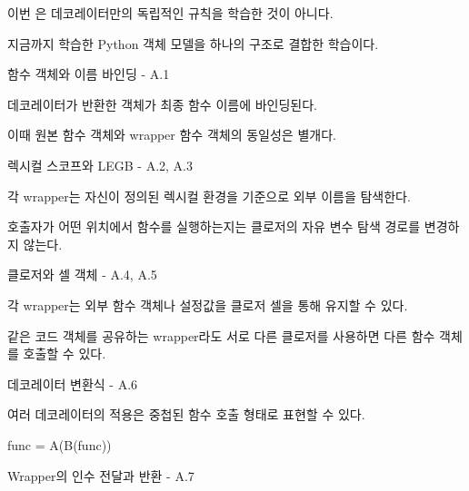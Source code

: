이번 은 데코레이터만의 독립적인 규칙을 학습한 것이 아니다.

지금까지 학습한 Python 객체 모델을 하나의 구조로 결합한 학습이다.

\begin{dhknote}
\begin{dhksmry}[centered]
함수 객체와 이름 바인딩 - A.1
\end{dhksmry}
\end{dhknote}

데코레이터가 반환한 객체가 최종 함수 이름에 바인딩된다.

이때 원본 함수 객체와 wrapper 함수 객체의 동일성은 별개다.

\begin{dhknote}
\begin{dhksmry}[centered]
렉시컬 스코프와 LEGB - A.2, A.3
\end{dhksmry}
\end{dhknote}

각 wrapper는 자신이 정의된 렉시컬 환경을 기준으로 외부 이름을 탐색한다.

호출자가 어떤 위치에서 함수를 실행하는지는 클로저의 자유 변수 탐색 경로를 변경하지 않는다.

\begin{dhknote}
\begin{dhksmry}[centered]
클로저와 셀 객체 - A.4, A.5
\end{dhksmry}
\end{dhknote}

각 wrapper는 외부 함수 객체나 설정값을 클로저 셀을 통해 유지할 수 있다.

같은 코드 객체를 공유하는 wrapper라도 서로 다른 클로저를 사용하면 다른 함수 객체를 호출할 수 있다.

\begin{dhknote}
\begin{dhksmry}[centered]
데코레이터 변환식 - A.6
\end{dhksmry}
\end{dhknote}

여러 데코레이터의 적용은 중첩된 함수 호출 형태로 표현할 수 있다.

\begin{dhkcode}
func = A(B(func))
\end{dhkcode}

\begin{dhknote}
\begin{dhksmry}[centered]
Wrapper의 인수 전달과 반환 - A.7
\end{dhksmry}
\end{dhknote}

